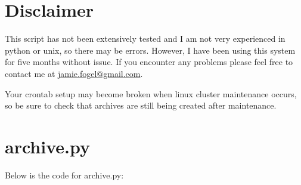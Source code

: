 \documentclass[11pt]{article}
\begin{document}
\section{Disclaimer}

This script has not been extensively tested and I am not very experienced in python or unix, so there may be errors. However, I have been using this system for five months without issue. If you encounter any problems please feel free to contact me at \href{mailto:jamie.fogel@gmail.com}{jamie.fogel@gmail.com}.

Your crontab setup may become broken when linux cluster maintenance occurs, so be sure to check that archives are still being created after maintenance.


\section{archive.py}

Below is the code for archive.py:
\end{document}
